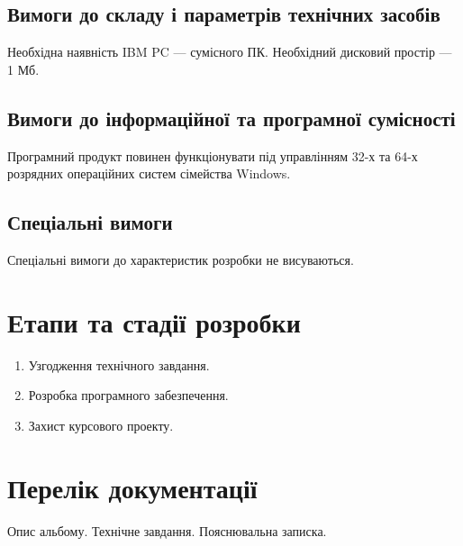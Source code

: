 \documentclass[ukrainian,utf8,nostitching,14pt]{eskdtext}
\begin{document}
\subsection{Вимоги до складу і параметрів технічних засобів}
Необхідна наявність IBM PC — сумісного ПК. Необхідний дисковий простір — 1 Мб.
\subsection{Вимоги до інформаційної та програмної сумісності}
Програмний продукт повинен функціонувати під управлінням 32-х та 64-х розрядних операційних систем сімейства Windows.
\subsection{Спеціальні вимоги}
Спеціальні вимоги до характеристик розробки не висуваються.


\section{Етапи та стадії розробки}

\begin{enumerate}
\item Узгодження технічного завдання.
\item Розробка програмного забезпечення.
\item Захист курсового проекту.
\end{enumerate}



\section{Перелік документації}
Опис альбому.
Технічне завдання.
Пояснювальна записка.
\end{document}
